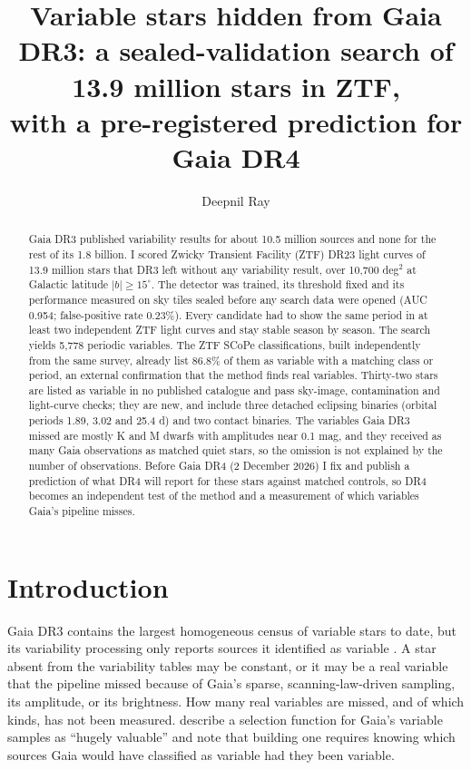 \documentclass[twocolumn]{searchchev_preprint}
\begin{document}
\title{Variable stars hidden from Gaia DR3: a sealed-validation search of 13.9 million stars in ZTF,\\
with a pre-registered prediction for Gaia DR4}

\author[0000-0001-8779-0700]{Deepnil Ray}

\begin{abstract}
Gaia DR3 published variability results for about 10.5 million sources and none for the rest of its 1.8 billion. I
scored Zwicky Transient Facility (ZTF) DR23 light curves of 13.9 million stars that DR3 left without any
variability result, over 10,700 deg$^2$ at Galactic latitude $|b|\ge15^\circ$. The detector was trained, its threshold
fixed and its performance measured on sky tiles sealed before any search data were opened (AUC 0.954; false-positive
rate 0.23\%). Every candidate had to show the same period in at least two independent ZTF light curves and stay
stable season by season. The search yields 5,778 periodic variables. The ZTF SCoPe classifications, built
independently from the same survey, already list 86.8\% of them as variable with a matching class or period, an
external confirmation that the method finds real variables. Thirty-two stars are listed as variable in no published
catalogue and pass sky-image, contamination and light-curve checks; they are new, and include three detached
eclipsing binaries (orbital periods 1.89, 3.02 and 25.4 d) and two contact binaries. The variables Gaia DR3 missed
are mostly K and M dwarfs with amplitudes near 0.1 mag, and they received as many Gaia observations as matched
quiet stars, so the omission is not explained by the number of observations. Before Gaia DR4 (2 December 2026) I fix and publish a
prediction of what DR4 will report for these stars against matched controls, so DR4 becomes an independent test of
the method and a measurement of which variables Gaia's pipeline misses.
\end{abstract}


\section{Introduction}
Gaia \citep{Gaia2016} DR3 \citep{Gaia2023} contains the largest homogeneous census of variable stars to date, but its
variability processing only reports sources it identified as variable \citep{Eyer2023,Rimoldini2023}. A star absent from the variability tables may be constant,
or it may be a real variable that the pipeline missed because of Gaia's sparse, scanning-law-driven sampling, its
amplitude, or its brightness. How many real variables are missed, and of which kinds, has not been measured.
\citet{Everall2022} describe a selection function for Gaia's variable samples as ``hugely valuable'' and note that
building one requires knowing which sources Gaia would have classified as variable had they been variable.
\end{document}
